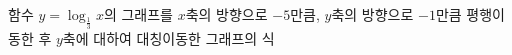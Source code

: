함수 $y=\log_{\frac{1}{3}} x$의 그래프를 $x$축의 방향으로 $-5$만큼, $y$축의 방향으로 $-1$만큼 평행이동한 후 $y$축에 대하여 대칭이동한 그래프의 식
